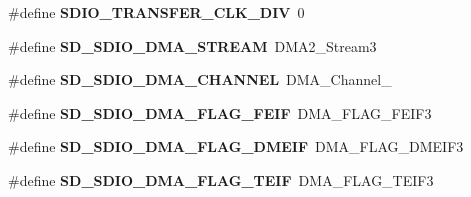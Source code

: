 \begin{DoxyCompactItemize}
\item 
\#define {\bfseries S\+D\+I\+O\+\_\+\+T\+R\+A\+N\+S\+F\+E\+R\+\_\+\+C\+L\+K\+\_\+\+D\+IV}~0\hypertarget{group___s_t_m324x_g___e_v_a_l___s_d_i_o___s_d___private___defines_gad37fe2cf88496122b5fdf14ae7f529b5}{}\label{group___s_t_m324x_g___e_v_a_l___s_d_i_o___s_d___private___defines_gad37fe2cf88496122b5fdf14ae7f529b5}

\item 
\#define {\bfseries S\+D\+\_\+\+S\+D\+I\+O\+\_\+\+D\+M\+A\+\_\+\+S\+T\+R\+E\+AM}~D\+M\+A2\+\_\+\+Stream3\hypertarget{group___s_t_m324x_g___e_v_a_l___s_d_i_o___s_d___private___defines_ga144c171660990547b329e9cc8d80cfcd}{}\label{group___s_t_m324x_g___e_v_a_l___s_d_i_o___s_d___private___defines_ga144c171660990547b329e9cc8d80cfcd}

\item 
\#define {\bfseries S\+D\+\_\+\+S\+D\+I\+O\+\_\+\+D\+M\+A\+\_\+\+C\+H\+A\+N\+N\+EL}~D\+M\+A\+\_\+\+Channel\+\_\hypertarget{group___s_t_m324x_g___e_v_a_l___s_d_i_o___s_d___private___defines_ga6f2bf8fb56b3b16c624945f5143f7c61}{}\label{group___s_t_m324x_g___e_v_a_l___s_d_i_o___s_d___private___defines_ga6f2bf8fb56b3b16c624945f5143f7c61}

\item 
\#define {\bfseries S\+D\+\_\+\+S\+D\+I\+O\+\_\+\+D\+M\+A\+\_\+\+F\+L\+A\+G\+\_\+\+F\+E\+IF}~D\+M\+A\+\_\+\+F\+L\+A\+G\+\_\+\+F\+E\+I\+F3\hypertarget{group___s_t_m324x_g___e_v_a_l___s_d_i_o___s_d___private___defines_ga48a2a089882dbc382f2cc4dc59a81439}{}\label{group___s_t_m324x_g___e_v_a_l___s_d_i_o___s_d___private___defines_ga48a2a089882dbc382f2cc4dc59a81439}

\item 
\#define {\bfseries S\+D\+\_\+\+S\+D\+I\+O\+\_\+\+D\+M\+A\+\_\+\+F\+L\+A\+G\+\_\+\+D\+M\+E\+IF}~D\+M\+A\+\_\+\+F\+L\+A\+G\+\_\+\+D\+M\+E\+I\+F3\hypertarget{group___s_t_m324x_g___e_v_a_l___s_d_i_o___s_d___private___defines_gad2ec52face7ffdaf2e9b51841460e4b3}{}\label{group___s_t_m324x_g___e_v_a_l___s_d_i_o___s_d___private___defines_gad2ec52face7ffdaf2e9b51841460e4b3}

\item 
\#define {\bfseries S\+D\+\_\+\+S\+D\+I\+O\+\_\+\+D\+M\+A\+\_\+\+F\+L\+A\+G\+\_\+\+T\+E\+IF}~D\+M\+A\+\_\+\+F\+L\+A\+G\+\_\+\+T\+E\+I\+F3\hypertarget{group___s_t_m324x_g___e_v_a_l___s_d_i_o___s_d___private___defines_ga6e9973b4f4efb4592fe0f280f67ee27b}{}\label{group___s_t_m324x_g___e_v_a_l___s_d_i_o___s_d___private___defines_ga6e9973b4f4efb4592fe0f280f67ee27b}


\end{DoxyCompactItemize}
